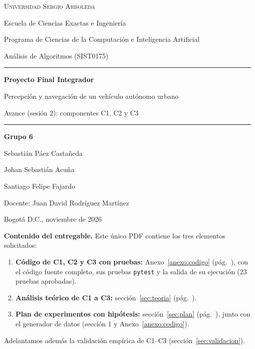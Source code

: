\documentclass[11pt,letterpaper]{article}
\theoremstyle{plain}
\theoremstyle{definition}
\newcommand{\cajah}[1]{\par\smallskip\colorbox{fondo}{\parbox{\dimexpr\linewidth-2\fboxsep}{\small #1}}\par\smallskip}
\begin{document}
\begin{titlepage}
\thispagestyle{empty}
\centering
{\large\textsc{Universidad Sergio Arboleda}\par}
\vspace{2mm}
{\normalsize Escuela de Ciencias Exactas e Ingeniería\par}
{\normalsize Programa de Ciencias de la Computación e Inteligencia Artificial\par}
\vspace{2.2cm}
{\large Análisis de Algoritmos (SIST0175)\par}
\vspace{6mm}
{\color{azul}\rule{0.7\linewidth}{0.8pt}\par}
\vspace{4mm}
{\LARGE\bfseries Proyecto Final Integrador\par}
\vspace{3mm}
{\Large Percepción y navegación de un vehículo autónomo urbano\par}
\vspace{3mm}
{\large Avance (sesión 2): componentes C1, C2 y C3\par}
{\color{azul}\rule{0.7\linewidth}{0.8pt}\par}
\vspace{2.2cm}
{\large\bfseries Grupo 6\par}
\vspace{3mm}
{\large Sebastián Páez Castañeda\par
Johan Sebastián Acuña\par
Santiago Felipe Fajardo\par}
\vspace{1.8cm}
{\normalsize Docente: Juan David Rodríguez Martínez\par}
\vfill
{\normalsize Bogotá D.C., noviembre de 2026\par}
\end{titlepage}

\tableofcontents
\vspace{6mm}
\cajah{\textbf{Contenido del entregable.} Este único PDF contiene los tres elementos solicitados:
\begin{enumerate}[leftmargin=1.5em,itemsep=0pt,topsep=2pt]
  \item \textbf{Código de C1, C2 y C3 con pruebas:} Anexo~\ref{anexo:codigo} (pág.~\pageref{anexo:codigo}),
  con el código fuente completo, sus pruebas \texttt{pytest} y la salida de su ejecución (23 pruebas aprobadas).
  \item \textbf{Análisis teórico de C1 a C3:} sección~\ref{sec:teoria} (pág.~\pageref{sec:teoria}).
  \item \textbf{Plan de experimentos con hipótesis:} sección~\ref{sec:plan} (pág.~\pageref{sec:plan}),
  junto con el generador de datos (sección 1 y Anexo~\ref{anexo:codigo}).
\end{enumerate}
Adelantamos además la validación empírica de C1--C3 (sección~\ref{sec:validacion}).}
\newpage
\end{document}
